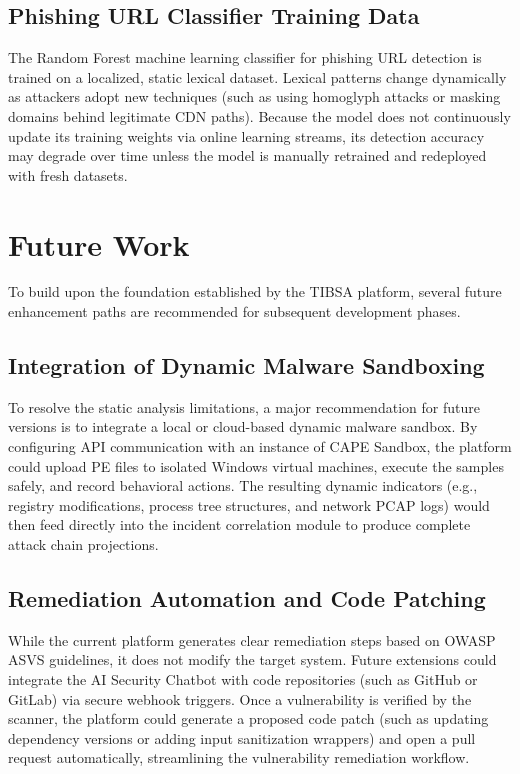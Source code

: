 \subsection{Phishing URL Classifier Training Data}
The Random Forest machine learning classifier for phishing URL detection is trained on a localized, static lexical dataset. Lexical patterns change dynamically as attackers adopt new techniques (such as using homoglyph attacks or masking domains behind legitimate CDN paths). Because the model does not continuously update its training weights via online learning streams, its detection accuracy may degrade over time unless the model is manually retrained and redeployed with fresh datasets.

\section{Future Work}
\label{sec:ch7_future_work}

To build upon the foundation established by the TIBSA platform, several future enhancement paths are recommended for subsequent development phases.

\subsection{Integration of Dynamic Malware Sandboxing}
To resolve the static analysis limitations, a major recommendation for future versions is to integrate a local or cloud-based dynamic malware sandbox. By configuring API communication with an instance of CAPE Sandbox, the platform could upload PE files to isolated Windows virtual machines, execute the samples safely, and record behavioral actions. The resulting dynamic indicators (e.g., registry modifications, process tree structures, and network PCAP logs) would then feed directly into the incident correlation module to produce complete attack chain projections.

\subsection{Remediation Automation and Code Patching}
While the current platform generates clear remediation steps based on OWASP ASVS guidelines, it does not modify the target system. Future extensions could integrate the AI Security Chatbot with code repositories (such as GitHub or GitLab) via secure webhook triggers. Once a vulnerability is verified by the scanner, the platform could generate a proposed code patch (such as updating dependency versions or adding input sanitization wrappers) and open a pull request automatically, streamlining the vulnerability remediation workflow.

